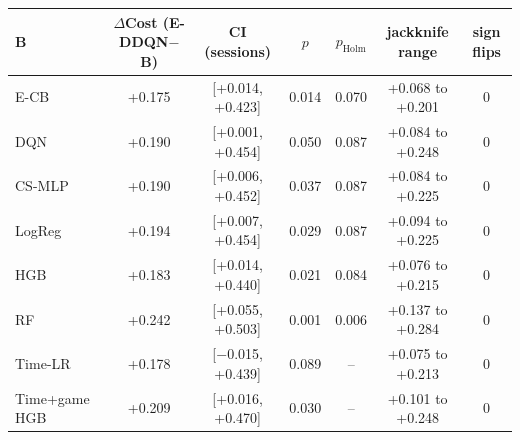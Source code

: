 \begin{tabular}{lcccccc}
\toprule
B & $\Delta$Cost (E-DDQN$-$B) & CI (sessions) & $p$ & $p_{\text{Holm}}$ & jackknife range & sign flips \\
\midrule
E-CB & +0.175 & [+0.014, +0.423] & 0.014 & 0.070 & +0.068 to +0.201 & 0 \\
DQN & +0.190 & [+0.001, +0.454] & 0.050 & 0.087 & +0.084 to +0.248 & 0 \\
CS-MLP & +0.190 & [+0.006, +0.452] & 0.037 & 0.087 & +0.084 to +0.225 & 0 \\
LogReg & +0.194 & [+0.007, +0.454] & 0.029 & 0.087 & +0.094 to +0.225 & 0 \\
HGB & +0.183 & [+0.014, +0.440] & 0.021 & 0.084 & +0.076 to +0.215 & 0 \\
RF & +0.242 & [+0.055, +0.503] & 0.001 & 0.006 & +0.137 to +0.284 & 0 \\
Time-LR & +0.178 & [$-$0.015, +0.439] & 0.089 & -- & +0.075 to +0.213 & 0 \\
Time+game HGB & +0.209 & [+0.016, +0.470] & 0.030 & -- & +0.101 to +0.248 & 0 \\
\bottomrule
\end{tabular}
